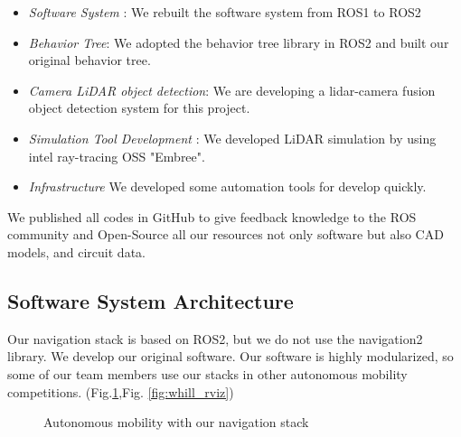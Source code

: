 \documentclass[lettersize,journal]{IEEEtran}
\begin{document}
\begin{itemize}
  \item {\it Software System }:
    We rebuilt the software system from ROS1 to ROS2
  \item {\it Behavior Tree}:
  We adopted the behavior tree library in ROS2 and built our original behavior tree.  
  \item {\it Camera LiDAR object detection}:
    We are developing a lidar-camera fusion object detection system for this project.
  \item {\it Simulation Tool Development }:
    We developed LiDAR simulation by using intel ray-tracing OSS "Embree".
  \item {\it Infrastructure}
    We developed some automation tools for develop quickly.
\end{itemize}
We published all codes in GitHub to give feedback knowledge to the ROS community and 
Open-Source all our resources not only software \cite{documentation_software}
but also CAD models, and circuit data. \cite{documentation_hardware}

\subsection{Software System Architecture}
Our navigation stack is based on ROS2, but we do not use the navigation2 library. We develop our original software.
Our software is highly modularized, so some of our team members use our stacks in other autonomous mobility competitions. 
(Fig.\ref{fig:whill},Fig. \ref{fig:whill_rviz})

\begin{figure}[H]
    \begin{center}
    \end{center}
    \caption{Autonomous mobility with our navigation stack}
    \label{fig:whill}
\end{figure}
\end{document}

